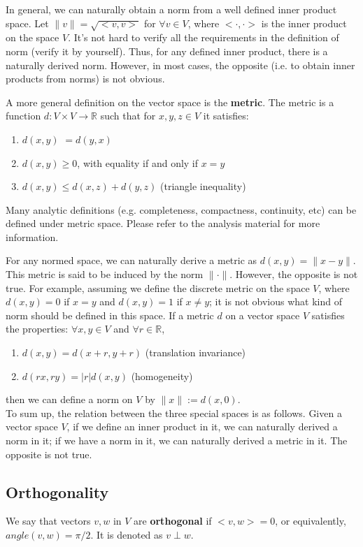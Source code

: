 \documentclass[12pt,oneside]{article}
\begin{document}
In general, we can naturally obtain a norm from a well defined inner product space.
Let $\|v\|=\sqrt{<v,v>}$ for $\forall v\in V$, where $<\cdot,\cdot>$ is the inner product on the space $V$.
It's not hard to verify all the requirements in the definition of norm (verify it by yourself).
Thus, for any defined inner product, there is a naturally derived norm.
However, in most cases, the opposite (i.e. to obtain inner products from norms) is not obvious.

A more general definition on the vector space is the \textbf{metric}. 
The metric is a function $d: V\times V\rightarrow \mathbb{R}$ such that for $x,y,z \in V$ it satisfies:
\begin{enumerate}
\item $d(x,y)$ $= d(y,x)$
\item $d(x,y) \geq 0$, with equality if and only if $x=y$
\item $d(x,y)\leq d(x,z)+d(y,z)$ (triangle inequality)
\end{enumerate}
Many analytic definitions (e.g. completeness, compactness, continuity, etc) can be defined under metric space.
Please refer to the analysis material for more information.

For any normed space, we can naturally derive a metric as $d(x,y)=\|x-y\|$. This metric is said to be induced by the norm $\|\cdot\|$. However, the opposite is not true. For example, assuming we define the discrete metric on the space $V$, where $d(x,y)=0$ if $x=y$ and $d(x,y)=1$ if $x\neq y$; it is not obvious what kind of norm should be defined in this space.
If a metric $d$ on a vector space $V$ satisfies the properties:
$\forall x, y\in V$ and $\forall r\in\mathbb{R}$,
\begin{enumerate}
\item $d(x,y) = d(x + r, y+r)$ (translation invariance)
\item $d(rx, ry) = |r| d(x, y)$ (homogeneity)
\end{enumerate}
then we can define a norm on $V$ by $\|x\| := d(x,0)$.\\


To sum up, the relation between the three special spaces is as follows.
Given a vector space $V$, if we define an inner product in it, we can naturally derived a norm in it; 
if we have a norm in it, we can naturally derived a metric in it.
The opposite is not true.

\subsection{Orthogonality}
We say that vectors $v, w$ in $V$ are \textbf{orthogonal} if $<v, w> =
0$, or equivalently, $angle(v,w)=\pi/2$. It is denoted as $v\perp w.$\\
\end{document}
